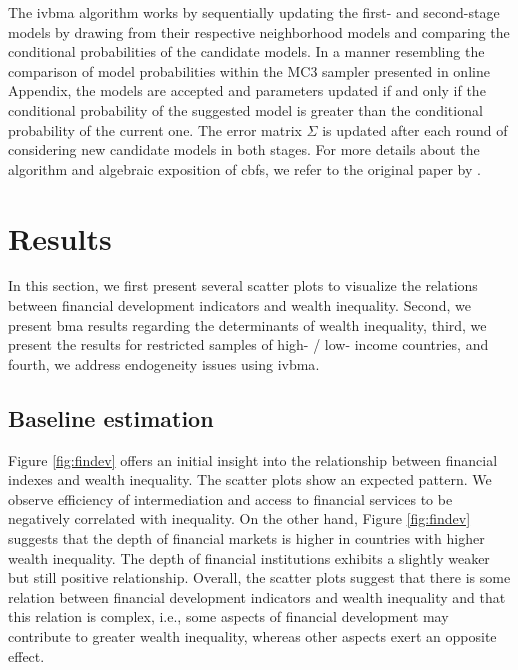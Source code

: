 \documentclass[a4paper,11pt]{article}
\begin{document}
The \ac{ivbma} algorithm works by sequentially updating the first- and second-stage models by drawing from their respective neighborhood models and comparing the conditional probabilities of the candidate models. In a manner resembling the comparison of model probabilities within the MC3 sampler presented in online Appendix, the models are accepted and parameters updated if and only if the conditional probability of the suggested model is greater than the conditional probability of the current one. The error matrix $\Sigma$ is updated after each round of considering new candidate models in both stages. For more details about the algorithm and algebraic exposition of \acp{cbf}, we refer to the original paper by \cite{KarlLenkoski2012}.

%
%
%
%
%

\section{Results}
\label{sec:results}
In this section, we first present several scatter plots to visualize the relations between financial development indicators and wealth inequality. Second, we present \ac{bma} results regarding the determinants of wealth inequality, third, we present the results for restricted samples of high- / low- income countries, and fourth, we address endogeneity issues using \ac{ivbma}.

\subsection{Baseline estimation}
Figure \ref{fig:findev} offers an initial insight into the relationship between financial indexes and wealth inequality. The scatter plots show an expected pattern.  We observe efficiency of intermediation and access to financial services to be negatively correlated with inequality. On the other hand, Figure \ref{fig:findev} suggests that the depth of financial markets is higher in countries with higher wealth inequality. The depth of financial institutions exhibits a slightly weaker but still positive relationship. Overall, the scatter plots suggest that there is some relation between financial development indicators and wealth inequality and that this relation is complex, i.e., some aspects of financial development may contribute to greater wealth inequality, whereas other aspects exert an opposite effect.
\end{document}
